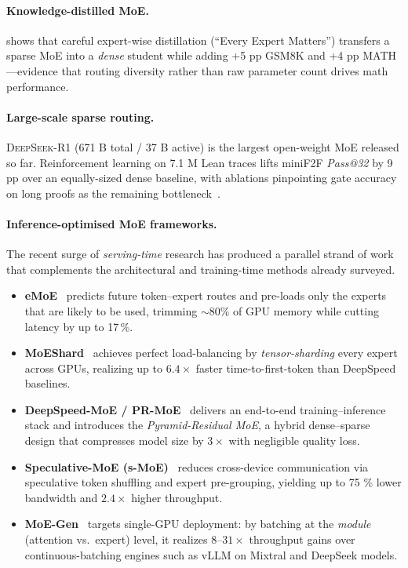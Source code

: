 \documentclass[acmsmall,anonymous]{acmart}
\begin{document}
\paragraph{Knowledge-distilled MoE.}
\citet{kim2025every} shows that careful expert-wise distillation (“Every
Expert Matters”) transfers a sparse MoE into a \emph{dense} student
while adding +5 pp GSM8K and +4 pp MATH—evidence that routing diversity
rather than raw parameter count drives math performance.

\paragraph{Large-scale sparse routing.}
\textsc{DeepSeek-R1} (671 B total / 37 B active) is the largest
open-weight MoE released so far. Reinforcement learning on 7.1 M Lean
traces lifts miniF2F \textit{Pass@32} by 9 pp over an equally-sized
dense baseline, with ablations pinpointing gate accuracy on long proofs
as the remaining bottleneck~\cite{deepseek2025r1}.

\paragraph{Inference-optimised MoE frameworks.}
The recent surge of \emph{serving-time} research has produced a parallel strand of work that complements the architectural and training-time methods already surveyed.  
\begin{itemize}
  \item \textbf{eMoE}~\cite{tairin2025emoe} predicts future token–expert routes and pre-loads only the experts that are likely to be used, trimming \mbox{$\sim$80\%} of GPU memory while cutting latency by up to 17\,\%.  
  \item \textbf{MoEShard}~\cite{balmau2025moeshard} achieves perfect load-balancing by \emph{tensor-sharding} every expert across GPUs, realizing up to $6.4\times$ faster time-to-first-token than DeepSpeed baselines.  
  \item \textbf{DeepSpeed-MoE / PR-MoE}~\cite{rajbhandari2022deepspeedmoe} delivers an end-to-end training–inference stack and introduces the \emph{Pyramid-Residual MoE}, a hybrid dense–sparse design that compresses model size by $3\times$ with negligible quality loss.  
  \item \textbf{Speculative-MoE (s-MoE)}~\cite{li2025speculativemoe} reduces cross-device communication via speculative token shuffling and expert pre-grouping, yielding up to 75 \% lower bandwidth and $2.4\times$ higher throughput.  
  \item \textbf{MoE-Gen}~\cite{xu2025moegen} targets single-GPU deployment: by batching at the \emph{module} (attention vs.\ expert) level, it realizes $8$–$31\times$ throughput gains over continuous-batching engines such as vLLM on Mixtral and DeepSeek models.  
\end{itemize}
\end{document}
